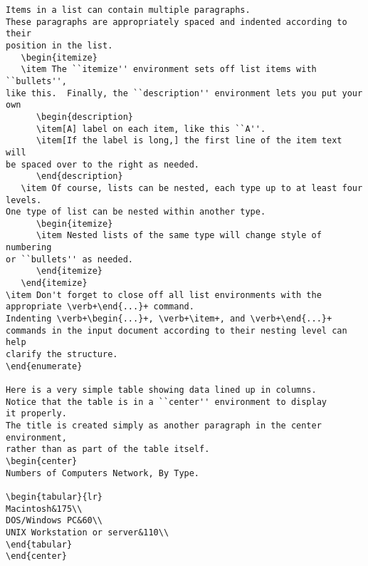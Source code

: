 \documentclass[11pt,oneside]{book}
\begin{document}
\begin{verbatim}
Items in a list can contain multiple paragraphs.
These paragraphs are appropriately spaced and indented according to their
position in the list.
   \begin{itemize}
   \item The ``itemize'' environment sets off list items with ``bullets'',
like this.  Finally, the ``description'' environment lets you put your own
      \begin{description}
      \item[A] label on each item, like this ``A''.
      \item[If the label is long,] the first line of the item text will
be spaced over to the right as needed.
      \end{description}
   \item Of course, lists can be nested, each type up to at least four levels.
One type of list can be nested within another type.
      \begin{itemize}
      \item Nested lists of the same type will change style of numbering
or ``bullets'' as needed.
      \end{itemize}
   \end{itemize}
\item Don't forget to close off all list environments with the
appropriate \verb+\end{...}+ command.
Indenting \verb+\begin{...}+, \verb+\item+, and \verb+\end{...}+
commands in the input document according to their nesting level can help
clarify the structure.
\end{enumerate}

Here is a very simple table showing data lined up in columns.
Notice that the table is in a ``center'' environment to display
it properly.
The title is created simply as another paragraph in the center environment,
rather than as part of the table itself.
\begin{center}
Numbers of Computers Network, By Type.

\begin{tabular}{lr}
Macintosh&175\\
DOS/Windows PC&60\\
UNIX Workstation or server&110\\
\end{tabular}
\end{center}


\end{verbatim}
\end{document}
